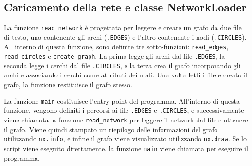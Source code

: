 \subsection{Caricamento della rete e classe NetworkLoader}

La funzione \texttt{read_network} è progettata per leggere e creare un grafo da due file di testo, uno contenente gli archi (\texttt{.EDGES}) e l'altro contenente i nodi (\texttt{.CIRCLES}). All'interno di questa funzione, sono definite tre sotto-funzioni: \texttt{read_edges}, \texttt{read_circles} e \texttt{create_graph}. La prima legge gli archi dal file \texttt{.EDGES}, la seconda legge i cerchi dal file \texttt{.CIRCLES}, e la terza crea il grafo incorporando gli archi e associando i cerchi come attributi dei nodi. Una volta letti i file e creato il grafo, la funzione restituisce il grafo stesso.

La funzione \texttt{main} costituisce l'entry point del programma. All'interno di questa funzione, vengono definiti i percorsi ai file \texttt{.EDGES} e \texttt{.CIRCLES}, e successivamente viene chiamata la funzione \texttt{read_network} per leggere il network dal file e ottenere il grafo. Viene quindi stampato un riepilogo delle informazioni del grafo utilizzando \texttt{nx.info}, e infine il grafo viene visualizzato utilizzando \texttt{nx.draw}. Se lo script viene eseguito direttamente, la funzione \texttt{main} viene chiamata per eseguire il programma.

